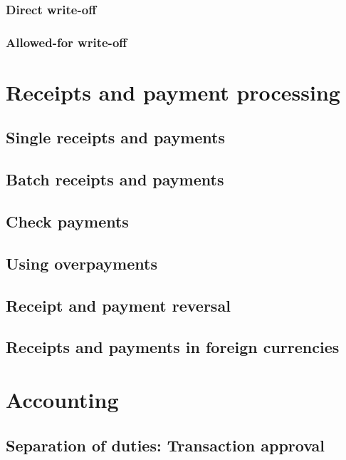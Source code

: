 \subsection{Direct write-off}

\subsection{Allowed-for write-off}


\chapter{Receipts and payment processing}


\section{Single receipts and payments}
\label{sec:SinglePayments}

\section{Batch receipts and payments}


\section{Check payments}


\section{Using overpayments}
\label{sec:UsingOverpayments}

\section{Receipt and payment reversal}

\section{Receipts and payments in foreign currencies}

\chapter{Accounting}

\section{Separation of duties: Transaction approval}
\label{sec:SeparationOfDuties}

